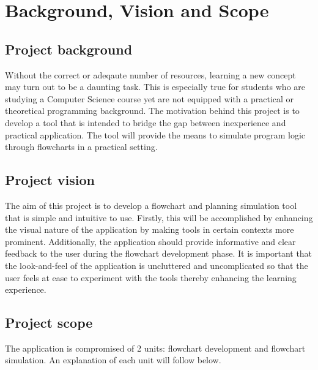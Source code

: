 \documentclass[12pt,a4paper,titlepage]{article}
\begin{document}


\newpage
\tableofcontents


\pagebreak

\section{Background, Vision and Scope}
\subsection{Project background}
Without the correct or adeqaute number of resources, learning a new concept may turn out to be a daunting task. This is especially true for students who are studying a Computer Science course yet are not equipped with a practical or theoretical programming background. The motivation behind this project is to develop a tool that is intended to bridge the  gap between inexperience and practical application. The tool will provide the means to simulate program logic through flowcharts in a practical setting. 

\subsection{Project vision}

The aim of this project is to develop a flowchart and planning simulation tool that is simple and intuitive to use. Firstly, this will be accomplished by enhancing the visual nature of the application by making tools in certain contexts more prominent. Additionally, the application should provide informative and clear feedback to the user during the flowchart development phase. It is important that the look-and-feel of the application is uncluttered and uncomplicated so that the user feels at ease to experiment with the tools thereby enhancing the learning experience.

\subsection{Project scope}

The application is compromised of 2 units: flowchart development and flowchart simulation. An explanation of each unit will follow below.
\end{document}
